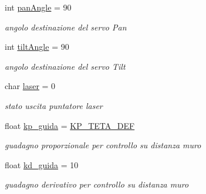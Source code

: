 \begin{DoxyCompactItemize}
\item 
\mbox{\label{ari_pi__2_d_c__esp__08_8ino_a41052b199a87567ee2438e605f1f949d}} 
int \mbox{\hyperlink{ari_pi__2_d_c__esp__08_8ino_a41052b199a87567ee2438e605f1f949d}{pan\+Angle}} = 90
\begin{DoxyCompactList}\small\item\em angolo destinazione del servo Pan \end{DoxyCompactList}\item 
\mbox{\label{ari_pi__2_d_c__esp__08_8ino_ad64f6da25c8c1de30ddeb9e0541fa839}} 
int \mbox{\hyperlink{ari_pi__2_d_c__esp__08_8ino_ad64f6da25c8c1de30ddeb9e0541fa839}{tilt\+Angle}} = 90
\begin{DoxyCompactList}\small\item\em angolo destinazione del servo Tilt \end{DoxyCompactList}\item 
\mbox{\label{ari_pi__2_d_c__esp__08_8ino_aa9eb73e0d7151ab1d50ab7d71114e6bd}} 
char \mbox{\hyperlink{ari_pi__2_d_c__esp__08_8ino_aa9eb73e0d7151ab1d50ab7d71114e6bd}{laser}} = 0
\begin{DoxyCompactList}\small\item\em stato uscita puntatore laser \end{DoxyCompactList}\item 
\mbox{\label{ari_pi__2_d_c__esp__08_8ino_ad22e5548abfe8e56154370047cf514f1}} 
float \mbox{\hyperlink{ari_pi__2_d_c__esp__08_8ino_ad22e5548abfe8e56154370047cf514f1}{kp\+\_\+guida}} = \mbox{\hyperlink{ari_pi__2_d_c__esp__08_8ino_a6ae4300a3f1fbbb8e3d4393603b6d402}{K\+P\+\_\+\+T\+E\+T\+A\+\_\+\+D\+EF}}
\begin{DoxyCompactList}\small\item\em guadagno proporzionale per controllo su distanza muro \end{DoxyCompactList}\item 
\mbox{\label{ari_pi__2_d_c__esp__08_8ino_aadac70a6d3f31635e120f1abbf02afb8}} 
float \mbox{\hyperlink{ari_pi__2_d_c__esp__08_8ino_aadac70a6d3f31635e120f1abbf02afb8}{kd\+\_\+guida}} = 10
\begin{DoxyCompactList}\small\item\em guadagno derivativo per controllo su distanza muro \end{DoxyCompactList}\item 

\end{DoxyCompactItemize}
